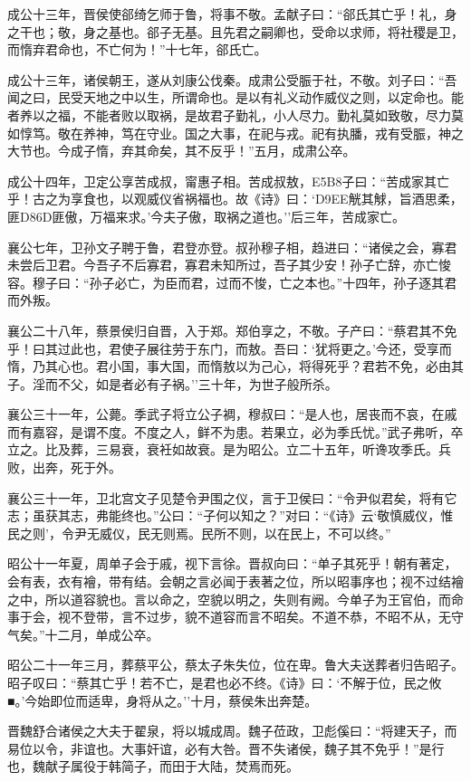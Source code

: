 \documentclass[]{article}
\begin{document}
成公十三年，晋侯使郤绮乞师于鲁，将事不敬。孟献子曰：``郤氏其亡乎！礼，身之干也；敬，身之基也。郤子无基。且先君之嗣卿也，受命以求师，将社稷是卫，而惰弃君命也，不亡何为！''十七年，郤氏亡。

成公十三年，诸侯朝王，遂从刘康公伐秦。成肃公受脤于社，不敬。刘子曰：``吾闻之曰，民受天地之中以生，所谓命也。是以有礼义动作威仪之则，以定命也。能者养以之福，不能者败以取祸，是故君子勤礼，小人尽力。勤礼莫如致敬，尽力莫如惇笃。敬在养神，笃在守业。国之大事，在祀与戎。祀有执膰，戎有受脤，神之大节也。今成子惰，弃其命矣，其不反乎！''五月，成肃公卒。

成公十四年，卫定公享苦成叔，甯惠子相。苦成叔敖，E5B8子曰：``苦成家其亡乎！古之为享食也，以观威仪省祸福也。故《诗》曰：`D9EE觥其觩，旨酒思柔，匪D86D匪傲，万福来求。'今夫子傲，取祸之道也。''后三年，苦成家亡。

襄公七年，卫孙文子聘于鲁，君登亦登。叔孙穆子相，趋进曰：``诸侯之会，寡君未尝后卫君。今吾子不后寡君，寡君未知所过，吾子其少安！孙子亡辞，亦亡悛容。穆子曰：``孙子必亡，为臣而君，过而不悛，亡之本也。''十四年，孙子逐其君而外叛。

襄公二十八年，蔡景侯归自晋，入于郑。郑伯享之，不敬。子产曰：``蔡君其不免乎！曰其过此也，君使子展往劳于东门，而敖。吾曰：`犹将更之。'今还，受享而惰，乃其心也。君小国，事大国，而惰敖以为己心，将得死乎？君若不免，必由其子。淫而不父，如是者必有子祸。''三十年，为世子般所杀。

襄公三十一年，公薨。季武子将立公子裯，穆叔曰：``是人也，居丧而不哀，在戚而有嘉容，是谓不度。不度之人，鲜不为患。若果立，必为季氏忧。''武子弗听，卒立之。比及葬，三易衰，衰衽如故衰。是为昭公。立二十五年，听谗攻季氏。兵败，出奔，死于外。

襄公三十一年，卫北宫文子见楚令尹围之仪，言于卫侯曰：``令尹似君矣，将有它志；虽获其志，弗能终也。''公曰：``子何以知之？''对曰：``《诗》云`敬慎威仪，惟民之则'，令尹无威仪，民无则焉。民所不则，以在民上，不可以终。''

昭公十一年夏，周单子会于戚，视下言徐。晋叔向曰：``单子其死乎！朝有著定，会有表，衣有襘，带有结。会朝之言必闻于表著之位，所以昭事序也；视不过结襘之中，所以道容貌也。言以命之，空貌以明之，失则有阙。今单子为王官伯，而命事于会，视不登带，言不过步，貌不道容而言不昭矣。不道不恭，不昭不从，无守气矣。''十二月，单成公卒。

昭公二十一年三月，葬蔡平公，蔡太子朱失位，位在卑。鲁大夫送葬者归告昭子。昭子叹曰：``蔡其亡乎！若不亡，是君也必不终。《诗》曰：`不解于位，民之攸■。'今始即位而适卑，身将从之。''十月，蔡侯朱出奔楚。

晋魏舒合诸侯之大夫于翟泉，将以城成周。魏子莅政，卫彪傒曰：``将建天子，而易位以令，非谊也。大事奸谊，必有大咎。晋不失诸侯，魏子其不免乎！''是行也，魏献子属役于韩简子，而田于大陆，焚焉而死。
\end{document}
